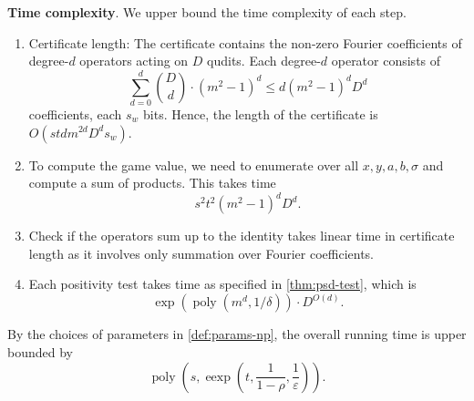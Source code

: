 \documentclass[11pt]{article}
\theoremstyle{plain}
\theoremstyle{definition}
\newcommand {\br} [1] {\ensuremath{ \left( #1 \right) }}
\newcommand{\poly} {\ensuremath{\operatorname{poly}}}
\newcommand{\ep} {\ensuremath{\varepsilon}}
\newcommand{\dlbo} {\ensuremath{{D}}}
\newcommand{\dldd} {\ensuremath{{d}}}
\newcommand{\wireal} {\ensuremath{{s_{w}}}}
\newcommand{\1}{\mathbb{1}} %
\begin{document}
\textbf{Time complexity}.
We upper bound the time complexity of each step.
\begin{enumerate}
  \item Certificate length: The certificate contains the non-zero Fourier coefficients of degree-$\dldd$ operators acting on $\dlbo$ qudits.
        Each degree-$\dldd$ operator consists of
        $$\sum_{d=0}^{\dldd}{\binom{\dlbo}{d} }\cdot (m^2-1)^{d} \le \dldd(m^2-1)^\dldd\dlbo^\dldd$$
coefficients, each $\wireal$ bits. Hence, the length of the certificate is $O(st\dldd m^{2\dldd}\dlbo^\dldd\wireal)$.
  \item To compute the game value, we need to enumerate over all $x, y, a, b, \sigma$ and compute a sum of products.
        This takes time
        $$s^2t^2(m^2-1)^dD^d.$$
  \item Check if the operators sum up to the identity takes linear time in            certificate length as it involves only summation over Fourier coefficients.
  \item Each positivity test takes time as specified in \cref{thm:psd-test}, which is
        $$\exp\br{\poly\br{m^d, 1/\delta}}\cdot D^{O(d)}.$$
\end{enumerate}
By the choices of parameters in \cref{def:params-np}, the overall running time is  upper bounded by
$$\poly\br{s, \operatorname{eexp}\br{t, \frac{1}{1-\rho}, \frac{1}{\ep}}}.$$
\end{document}

